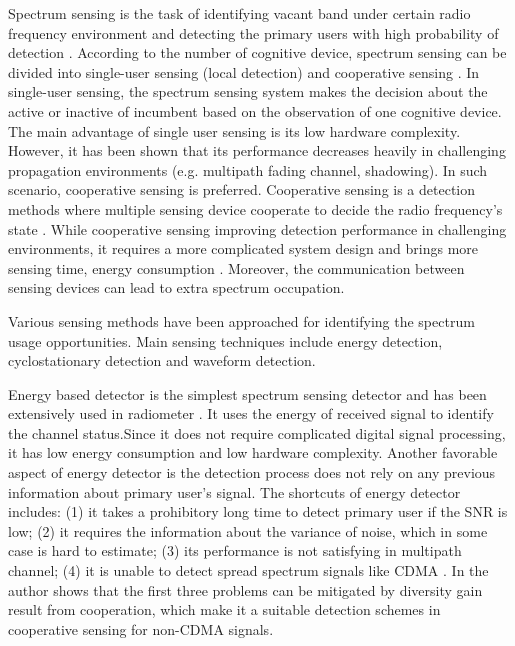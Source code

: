 Spectrum sensing is the task of identifying vacant band under certain radio frequency environment and detecting the primary users with high probability of detection  \cite{umar2012spectrum}. 
According to the number of cognitive device, spectrum sensing can be divided into single-user sensing (local detection) and cooperative sensing \cite{wang2011advance, sakyildiz2011cooperative, ma2008soft, axell2010overview}. In single-user sensing, the spectrum sensing system makes the decision about the active or inactive of incumbent based on the observation of one cognitive device. The main advantage of single user sensing is its low hardware complexity. However, it has been shown that its performance decreases heavily in challenging propagation environments (e.g. multipath fading channel, shadowing). In such scenario, cooperative sensing is preferred. Cooperative sensing is a detection methods where multiple sensing device cooperate to decide the radio frequency's state \cite{ganesan2005cooperative, arslan2007cognitive}. While cooperative sensing improving detection performance in challenging environments, it requires a more complicated system design and brings more sensing time, energy consumption \cite{akyildiz2011cooperative}.  
Moreover, the communication between sensing devices can lead to extra spectrum occupation. 

Various sensing methods have been approached for identifying the spectrum usage opportunities. Main sensing techniques include  energy detection, cyclostationary detection and waveform detection. 

Energy based detector is the simplest spectrum sensing detector and has been extensively used in radiometer \cite{cabric2004implementation, poor1994introduction, urkowitz1967energy}. It uses the energy of received signal to identify the channel status.Since it does not require complicated digital signal processing, it has low energy consumption and low hardware complexity.  Another favorable aspect of energy detector is the detection process does not rely on  any previous information about primary user's signal.  
The shortcuts of energy detector includes: (1) it takes a prohibitory long time to detect primary user if the SNR is low; (2) it requires the information about the variance of noise, which in some case is hard to estimate; (3) its performance is not satisfying in multipath channel; (4) it is unable to detect spread spectrum signals like CDMA \cite{urkowitz1967energy, akyildiz2011cooperative}. 
In \cite{akyildiz2011cooperative} the author shows that the first three problems can be mitigated by diversity gain result from cooperation, which make it a suitable detection schemes in cooperative sensing for non-CDMA signals.  


